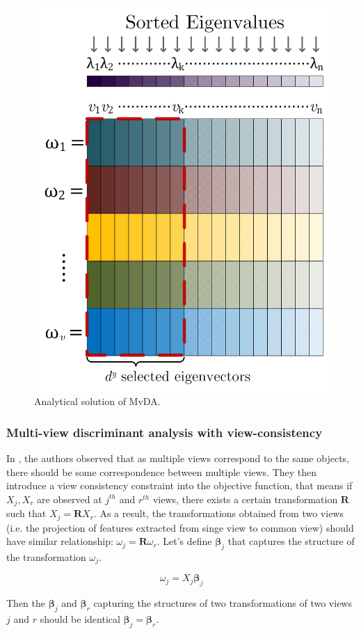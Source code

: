         \begin{figure}[htbp]
            \centering
            \includegraphics[width=0.4\linewidth]{figs/mvda_solution.png}
            \caption{Analytical solution of MvDA.}
            \label{fig:mvda_solution}
        \end{figure}

    \subsubsection{Multi-view discriminant analysis with view-consistency} \label{subsubsec:mvdavc}

        In \cite{kan2016multi}, the authors observed that as multiple views correspond to the same objects, there should be some correspondence between multiple views.
        They then introduce a view consistency constraint into the objective function, that means if $X_j, X_r$ are observed at $j^{th}$ and $r^{th}$ views, there exists a certain transformation $\boldsymbol{R}$ such that $X_j = \boldsymbol{R}X_r$.
        As a result, the transformations obtained from two views (i.e. the projection of features extracted from singe view to common view) should have similar relationship: ${\omega}_j = \boldsymbol{R}{\omega}_r$.
        Let's define $\boldsymbol{\beta}_j$ that captures the structure of the transformation ${\omega}_j$.

        \begin{equation}
            \omega_j = X_j\boldsymbol{\beta}_j
            \label{eq:MvDA-vc_beta}
        \end{equation}

        Then the $\boldsymbol{\beta}_j$ and $\boldsymbol{\beta}_r$ capturing the structures of two transformations of two views $j$ and $r$ should be identical ${\boldsymbol{\beta}}_j = {\boldsymbol{\beta}}_r$.


